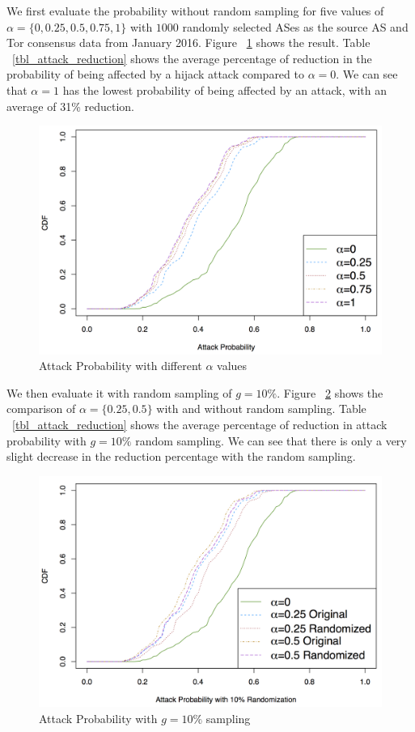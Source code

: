 We first evaluate the probability without random sampling for five values of $\alpha=\{0, 0.25, 0.5, 0.75, 1\}$ with $1000$ randomly selected ASes as the source AS and Tor consensus data from January 2016. Figure ~\ref{fig_attack} shows the result. Table ~\ref{tbl_attack_reduction} shows the average percentage of reduction in the probability of being affected by a hijack attack compared to $\alpha=0$. We can see that $\alpha=1$ has the lowest probability of being affected by an attack, with an average of 31\% reduction. 

\begin{figure}[ht!]
\centering
\includegraphics[width=.4\textwidth]{figure/attack}
\caption{Attack Probability with different $\alpha$ values \label{fig_attack}}
\end{figure}


We then evaluate it with random sampling of $g=10\%$. Figure ~\ref{fig_attack_random} shows the comparison of $\alpha=\{0.25, 0.5\}$ with and without random sampling. Table ~\ref{tbl_attack_reduction} shows the average percentage of reduction in attack probability with $g=10\%$ random sampling. We can see that there is only a very slight decrease in the reduction percentage with the random sampling. 

\begin{figure}[ht!]
\centering
\includegraphics[width=.4\textwidth]{figure/attack_randomize}
\caption{Attack Probability with $g=10\%$ sampling \label{fig_attack_random}}
\end{figure}

